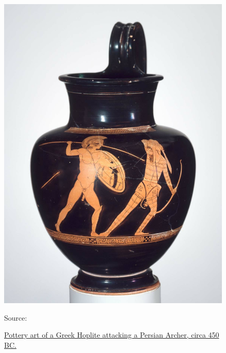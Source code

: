 \documentclass[twoside, a4paper, 12pt]{article}
\newcommand{\sourceR}[1]{\caption*{\hfill Source: {#1}} }
\begin{document}
\begin{figure}
  \centering
  \includegraphics[width=\linewidth]{HopliteArcher.jpg}
  \captionsetup{justification=raggedleft}
  \caption{\ul{ Pottery art of a Greek Hoplite attacking a Persian Archer, circa 450 BC.}}
  \sourceR{\cite{MFABoston_2017_hoplite}}
  \label{img:HopliteArcher}
\end{figure}
\end{document}
